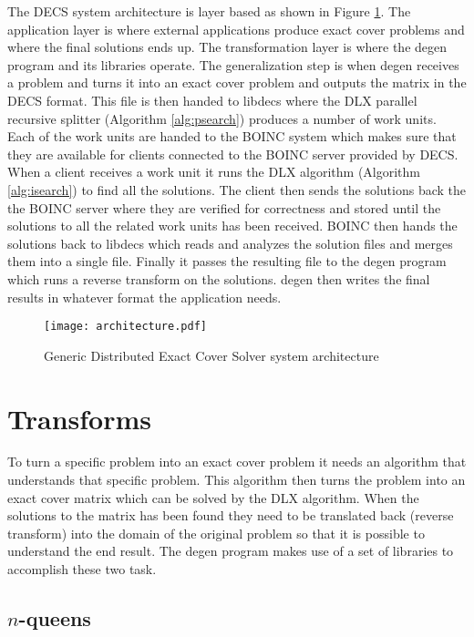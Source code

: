 The DECS system architecture is layer based as shown in Figure \ref{fig:architecture}.
The application layer is where external applications produce exact cover problems and where the final solutions ends up.
The transformation layer is where the degen program and its libraries operate.
The generalization step is when degen receives a problem and turns it into an exact cover problem and outputs the matrix in the DECS format.
This file is then handed to libdecs where the DLX parallel recursive splitter (Algorithm \ref{alg:psearch}) produces a number of work units.
Each of the work units are handed to the BOINC system which makes sure that they are available for clients connected to the BOINC server provided by DECS.
When a client receives a work unit it runs the DLX algorithm (Algorithm \ref{alg:isearch}) to find all the solutions.
The client then sends the solutions back the the BOINC server where they are verified for correctness and stored until the solutions to all the related work units has been received.
BOINC then hands the solutions back to libdecs which reads and analyzes the solution files and merges them into a single file.
Finally it passes the resulting file to the degen program which runs a reverse transform on the solutions.
degen then writes the final results in whatever format the application needs.

\begin{figure}[htbp]
	\centering 
	\texttt{[image: architecture.pdf]}
	\caption{Generic Distributed Exact Cover Solver system architecture}
	\label{fig:architecture}
\end{figure}


\section{Transforms}
\label{transforms}

To turn a specific problem into an exact cover problem it needs an algorithm that understands that specific problem.
This algorithm then turns the problem into an exact cover matrix which can be solved by the DLX algorithm.
When the solutions to the matrix has been found they need to be translated back (reverse transform) into the domain of the original problem so that it is possible to understand the end result.
The degen program makes use of a set of libraries to accomplish these two task.


\subsection{\texorpdfstring{$n$}{n}-queens}
\label{queens_trans}


